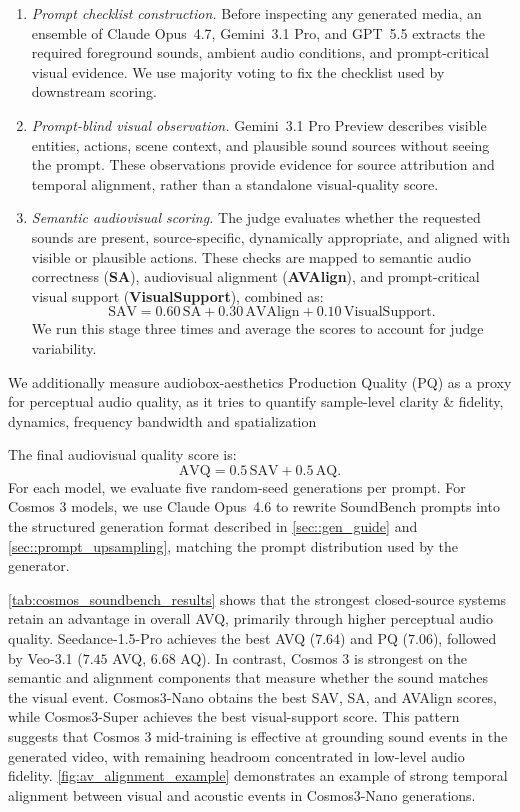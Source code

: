 \begin{enumerate}
    \item \textit{Prompt checklist construction.} Before inspecting any generated media, an ensemble of Claude Opus~4.7, Gemini~3.1 Pro, and GPT~5.5 extracts the required foreground sounds, ambient audio conditions, and prompt-critical visual evidence. We use majority voting to fix the checklist used by downstream scoring.
    \item \textit{Prompt-blind visual observation.} Gemini~3.1 Pro Preview describes visible entities, actions, scene context, and plausible sound sources without seeing the prompt. These observations provide evidence for source attribution and temporal alignment, rather than a standalone visual-quality score.
    \item \textit{Semantic audiovisual scoring.} The judge evaluates whether the requested sounds are present, source-specific, dynamically appropriate, and aligned with visible or plausible actions. These checks are mapped to semantic audio correctness (\textbf{SA}), audiovisual alignment (\textbf{AVAlign}), and prompt-critical visual support (\textbf{VisualSupport}), combined as:
    \[
        \mathrm{SAV}=0.60\,\mathrm{SA}+0.30\,\mathrm{AVAlign}+0.10\,\mathrm{VisualSupport}.
    \]
    We run this stage three times and average the scores to account for judge variability.
\end{enumerate}

We additionally measure audiobox-aesthetics Production Quality (PQ) as a proxy for perceptual audio quality, as it tries to quantify sample-level clarity \& fidelity, dynamics, frequency bandwidth and spatialization~\citep{tjandra2025audioboxaesthetics}

The final audiovisual quality score is:
\[
    \mathrm{AVQ}=0.5\,\mathrm{SAV}+0.5\,\mathrm{AQ}.
\]
For each model, we evaluate five random-seed generations per prompt. For Cosmos 3 models, we use Claude Opus~4.6 to rewrite SoundBench prompts into the structured generation format described in \cref{sec::gen_guide} and \cref{sec::prompt_upsampling}, matching the prompt distribution used by the generator.





\cref{tab:cosmos_soundbench_results} shows that the strongest closed-source systems retain an advantage in overall AVQ, primarily through higher perceptual audio quality. Seedance-1.5-Pro achieves the best AVQ ($7.64$) and PQ ($7.06$), followed by Veo-3.1 ($7.45$ AVQ, $6.68$ AQ). In contrast, Cosmos 3 is strongest on the semantic and alignment components that measure whether the sound matches the visual event. Cosmos3-Nano obtains the best SAV, SA, and AVAlign scores, while Cosmos3-Super achieves the best visual-support score. This pattern suggests that Cosmos 3 mid-training is effective at grounding sound events in the generated video, with remaining headroom concentrated in low-level audio fidelity. \cref{fig:av_alignment_example} demonstrates an example of strong temporal alignment between visual and acoustic events in Cosmos3-Nano generations.
